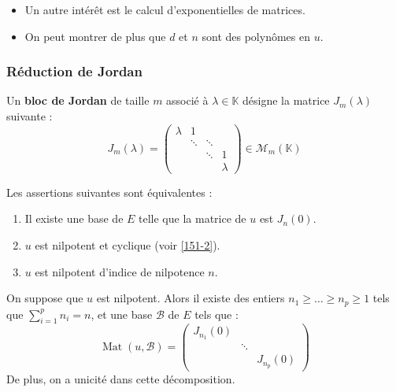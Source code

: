  \begin{remark}
    \begin{itemize}
      \item Un autre intérêt est le calcul d'exponentielles de matrices.
      \item On peut montrer de plus que $d$ et $n$ sont des polynômes en $u$.
    \end{itemize}
  \end{remark}

  \subsubsection{Réduction de Jordan}


  \begin{definition}
    Un \textbf{bloc de Jordan} de taille $m$ associé à $\lambda \in \mathbb{K}$ désigne la matrice $J_m(\lambda)$ suivante :
    \[ J_m(\lambda) = \begin{pmatrix} \lambda & 1 & \\ & \ddots & \ddots & \\ & & \ddots & 1 \\ & & & \lambda \end{pmatrix} \in \mathcal{M}_m(\mathbb{K}) \]
  \end{definition}

  \begin{proposition}
    Les assertions suivantes sont équivalentes :
    \begin{enumerate}[label={\bfseries(\roman*)}]
      \item Il existe une base de $E$ telle que la matrice de $u$ est $J_n(0)$.
      \item $u$ est nilpotent et cyclique (voir \cref{151-2}).
      \item $u$ est nilpotent d'indice de nilpotence $n$.
    \end{enumerate}
  \end{proposition}

  \begin{theorem}
    On suppose que $u$ est nilpotent. Alors il existe des entiers $n_1 \geq \dots \geq n_p \geq 1$ tels que $\sum_{i=1}^p n_i=n$, et une base $\mathcal{B}$ de $E$ tels que :
    \[ \operatorname{Mat}(u, \mathcal{B}) = \begin{pmatrix} J_{n_1}(0) & & \\ & \ddots & \\ & & J_{n_p}(0) \end{pmatrix} \]
    De plus, on a unicité dans cette décomposition.
  \end{theorem}

